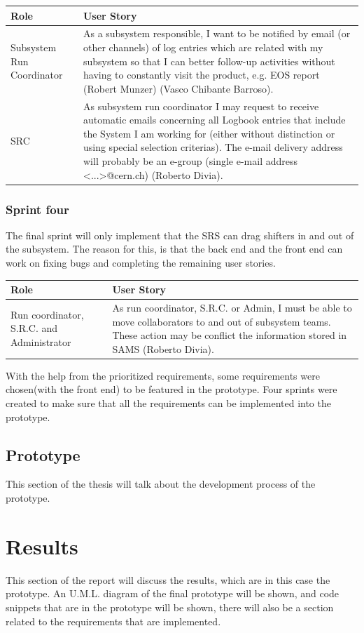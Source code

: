 \documentclass[paper=a4, fontsize=11pt,twoside]{scrartcl}	%
\begin{document}
\begin{longtable}{ | p{4cm} | p{10cm} |}
\hline
Role & User Story \\ \hline
Subsystem Run Coordinator &  As a subsystem responsible, I want to be notified by email (or other
channels) of log entries which are related with my subsystem so that I can better follow-up activities without having to constantly visit the product, e.g. EOS report (Robert Munzer) (Vasco Chibante Barroso).  \\ \hline
SRC & As subsystem run coordinator I may request to receive automatic emails concerning all Logbook entries that include the System I am working for (either without distinction or using special selection criterias). The e-mail delivery address will probably be an e-group (single e-mail address <...>@cern.ch) (Roberto Divia). \\ \hline
\end{longtable}

\subsubsection{Sprint four}
The final sprint will only implement that the SRS can drag shifters in and out of the subsystem. The reason for this, is that the back end and the front end can work on fixing bugs and completing the remaining user stories.

\begin{longtable}{ | p{4cm} | p{10cm} |}
\hline
Role & User Story \\ \hline
Run coordinator, S.R.C. and Administrator &  As run coordinator, S.R.C. or Admin, I must be able to move collaborators to and out of subsystem teams. These action may be conflict the information stored in SAMS (Roberto Divia). \\ \hline
\end{longtable}

With the help from the prioritized requirements, some requirements were chosen(with the front end) to be featured in the prototype. Four sprints were created to make sure that all the requirements can be implemented into the prototype.

\newpage
\subsection{Prototype}
This section of the thesis will talk about the development process of the prototype.

\newpage
\section{Results}
This section of the report will discuss the results, which are in this case the prototype. An U.M.L. diagram of the final prototype will be shown, and code snippets that are in the prototype will be shown, there will also be a section related to the requirements that are implemented.
\end{document}
